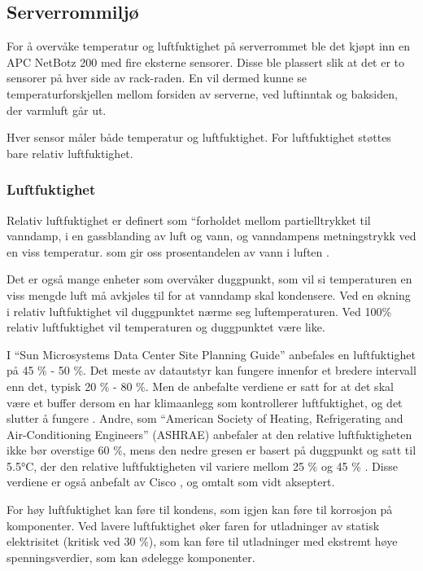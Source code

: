 \subsection{Serverrommiljø}

For å overvåke temperatur og luftfuktighet på serverrommet ble det kjøpt inn en APC NetBotz 200 \cite{netbotz2} med fire eksterne sensorer. Disse ble plassert slik at det er to sensorer på hver side av rack-raden. En vil dermed kunne se temperaturforskjellen mellom forsiden av serverne, ved luftinntak og baksiden, der varmluft går ut.

Hver sensor måler både temperatur og luftfuktighet. For luftfuktighet støttes bare relativ luftfuktighet.

\subsubsection{Luftfuktighet}

Relativ luftfuktighet er definert som “forholdet mellom partielltrykket til vanndamp, i en gassblanding av luft og vann, og vanndampens metningstrykk ved en viss temperatur. som gir oss prosentandelen av vann i luften \cite{wiki:luftfuktighet}. 

Det er også mange enheter som overvåker duggpunkt, som vil si temperaturen en viss mengde luft må avkjøles til for at vanndamp skal kondensere. Ved en økning i relativ luftfuktighet vil duggpunktet nærme seg luftemperaturen. Ved 100\% relativ luftfuktighet vil temperaturen og duggpunktet være like. 

I “Sun Microsystems Data Center Site Planning Guide” anbefales en luftfuktighet på 45 \% - 50 \%. Det meste av datautstyr kan fungere innenfor et bredere intervall enn det, typisk 20 \% - 80 \%. Men de anbefalte verdiene er satt for at det skal være et buffer dersom en har klimaanlegg som kontrollerer luftfuktighet, og det slutter å fungere \cite{planningserver}. Andre, som “American Society of Heating, Refrigerating and Air-Conditioning Engineers” (ASHRAE) anbefaler at den relative luftfuktigheten ikke bør overstige 60 \%, mens den nedre gresen er basert på duggpunkt og satt til 5.5°C, der den relative luftfuktigheten vil variere mellom 25 \% og 45 \% \cite{envguide}. Disse verdiene er også anbefalt av Cisco \cite{ciscoenvguide}, og omtalt som vidt akseptert. 

For høy luftfuktighet kan føre til kondens, som igjen kan føre til korrosjon på komponenter. Ved lavere luftfuktighet øker faren for utladninger av statisk elektrisitet (kritisk ved 30 \%), som kan føre til utladninger med ekstremt høye spenningsverdier, som kan ødelegge komponenter.

